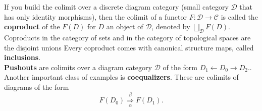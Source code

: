 \begin{example}

If you build the colimit over a discrete diagram category (small category $\mathcal{D}$ that has only identity morphisms), then the colimit of a functor $F: \mathcal{D} \rightarrow \mathcal{C}$ is called the \textbf{coproduct} of the $F(D)$ for $D$ an object of $\mathcal{D}$, denoted by
        $
        \bigsqcup_{\mathcal{D}} F(D) .
        $
        Coproducts in the category of sets and in the category of topological spaces are the disjoint unions
        Every coproduct comes with canonical structure maps, called \textbf{inclusions}.\\
\textbf{Pushouts} are colimits over a diagram category $\mathcal{D}$ of the form
        $
        D_1 \leftarrow D_0 \rightarrow D_2 .
        $.\\
Another important class of examples is \textbf{coequalizers}. These are colimits of diagrams of the form
        $$
        F\left(D_0\right) \underset{\alpha}{\stackrel{\beta}{\Longrightarrow}} F\left(D_1\right) .
        $$



\end{example}
